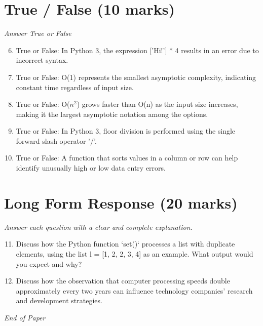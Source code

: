 \documentclass[12pt]{article}
\begin{document}
\section*{True / False (10 marks)}
\textit{Answer True or False}
\begin{enumerate}[label=\arabic*.]
\setcounter{enumi}{5}
\item True or False: In Python 3, the expression ['Hi!'] * 4 results in an error due to incorrect syntax.
\item True or False: O(1) represents the smallest asymptotic complexity, indicating constant time regardless of input size.
\item True or False: O($n^2$) grows faster than O(n) as the input size increases, making it the largest asymptotic notation among the options.
\item True or False: In Python 3, floor division is performed using the single forward slash operator '/'.
\item True or False: A function that sorts values in a column or row can help identify unusually high or low data entry errors.
\end{enumerate}

\section*{Long Form Response (20 marks)}
\textit{Answer each question with a clear and complete explanation.}
\begin{enumerate}[label=\arabic*.]
\setcounter{enumi}{10}
\item Discuss how the Python function `set()` processes a list with duplicate elements, using the list l = [1, 2, 2, 3, 4] as an example. What output would you expect and why?
\item Discuss how the observation that computer processing speeds double approximately every two years can influence technology companies' research and development strategies.
\end{enumerate}

\vfill
\noindent\textit{End of Paper}
\end{document}
